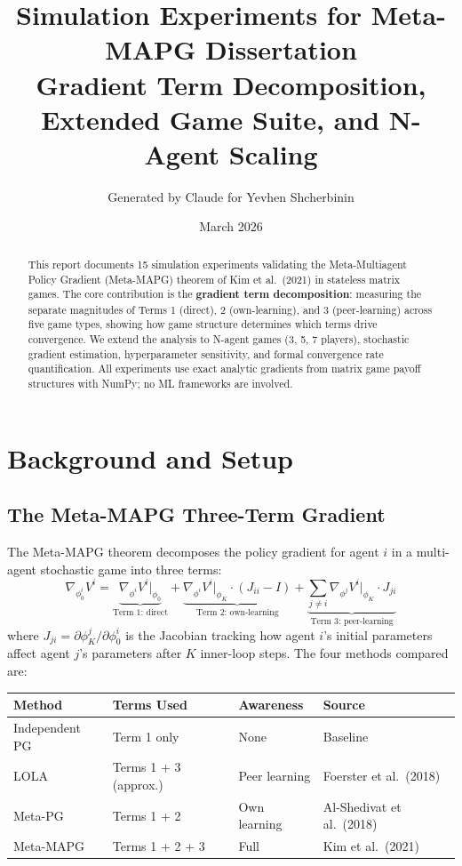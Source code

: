 \documentclass[11pt,a4paper]{article}
\title{\textbf{Simulation Experiments for Meta-MAPG Dissertation}\\[0.5em]
\large Gradient Term Decomposition, Extended Game Suite, and N-Agent Scaling}
\author{Generated by Claude for Yevhen Shcherbinin}
\date{March 2026}
\begin{document}
\maketitle

\begin{abstract}
This report documents 15 simulation experiments validating the Meta-Multiagent Policy Gradient (Meta-MAPG) theorem of Kim et al.\ (2021) in stateless matrix games. The core contribution is the \textbf{gradient term decomposition}: measuring the separate magnitudes of Terms 1 (direct), 2 (own-learning), and 3 (peer-learning) across five game types, showing how game structure determines which terms drive convergence. We extend the analysis to N-agent games (3, 5, 7 players), stochastic gradient estimation, hyperparameter sensitivity, and formal convergence rate quantification. All experiments use exact analytic gradients from matrix game payoff structures with NumPy; no ML frameworks are involved.
\end{abstract}

\tableofcontents
\newpage

\section{Background and Setup}

\subsection{The Meta-MAPG Three-Term Gradient}

The Meta-MAPG theorem decomposes the policy gradient for agent $i$ in a multi-agent stochastic game into three terms:
\begin{equation}
\nabla_{\phi^i_0} V^i = \underbrace{\nabla_{\phi^i} V^i\big|_{\phi_0}}_{\text{Term 1: direct}} + \underbrace{\nabla_{\phi^i} V^i\big|_{\phi_K} \cdot (J_{ii} - I)}_{\text{Term 2: own-learning}} + \underbrace{\sum_{j \neq i} \nabla_{\phi^j} V^i\big|_{\phi_K} \cdot J_{ji}}_{\text{Term 3: peer-learning}}
\label{eq:meta-mapg}
\end{equation}
where $J_{ji} = \partial \phi^j_K / \partial \phi^i_0$ is the Jacobian tracking how agent $i$'s initial parameters affect agent $j$'s parameters after $K$ inner-loop steps. The four methods compared are:

\begin{center}
\begin{tabular}{llll}
\toprule
\textbf{Method} & \textbf{Terms Used} & \textbf{Awareness} & \textbf{Source} \\
\midrule
Independent PG & Term 1 only & None & Baseline \\
LOLA & Terms 1 + 3 (approx.) & Peer learning & Foerster et al.\ (2018) \\
Meta-PG & Terms 1 + 2 & Own learning & Al-Shedivat et al.\ (2018) \\
Meta-MAPG & Terms 1 + 2 + 3 & Full & Kim et al.\ (2021) \\
\bottomrule
\end{tabular}
\end{center}
\end{document}

